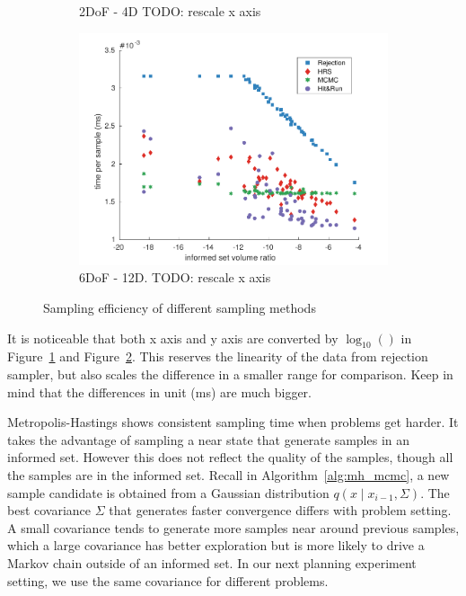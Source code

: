 \documentclass[letterpaper, 10 pt, conference]{ieeeconf}  %
\begin{document}
\begin{figure}[t!]
\begin{subfigure}[b]{0.78\linewidth}
		\caption{2DoF - 4D TODO: rescale x axis}
		\label{fig:sampling_efficiency:2d}
	\end{subfigure}
	\begin{subfigure}[b]{0.78\linewidth}
		\includegraphics[width=\linewidth]{fig/sampling_efficiency/sample_efficiency_6d}
		\caption{6DoF - 12D. TODO: rescale x axis}
		\label{fig:sampling_efficiency:6d}
	\end{subfigure}
	\caption{\captionstyle Sampling efficiency of different sampling methods}
	\label{fig:sampling_efficiency}
\end{figure} 

It is noticeable that both x axis and y axis are converted by $ \log_{10} () $ in Figure~\ref{fig:sampling_efficiency:2d} and Figure~\ref{fig:sampling_efficiency:6d}.
This reserves the linearity of the data from rejection sampler, but also scales the difference in a smaller range for comparison.
Keep in mind that the differences in unit (ms) are much bigger.

Metropolis-Hastings shows consistent sampling time when problems get harder. 
It takes the advantage of sampling a near state that generate samples in an informed set.
However this does not reflect the quality of the samples, though all the samples are in the informed set.
Recall in Algorithm~\ref{alg:mh_mcmc}, a new sample candidate is obtained from a Gaussian distribution $ q( x \mid x_{i-1}, \Sigma ) $.
The best covariance $ \Sigma $ that generates faster convergence differs with problem setting.
A small covariance tends to generate more samples near around previous samples, which a large covariance has better exploration but is more likely to drive a Markov chain outside of an informed set.
In our next planning experiment setting, we use the same covariance for different problems.
\end{document}
